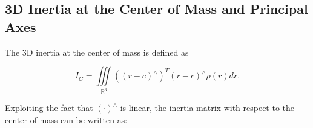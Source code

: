 

\subsection{3D Inertia at the Center of Mass and Principal Axes}
\label{subsec:principalAxis}

The 3D inertia at the center of mass is defined as

\begin{equation}
\label{eq:comInertiaDef}
I_C = \iiint\limits_{\mathbb{R}^3} ((r-c)^\wedge)^T (r-c)^\wedge \rho(r) dr .
\end{equation}

Exploiting the fact that $(\cdot)^\wedge$ is linear, the inertia matrix with respect to the center of mass can be written as: 

